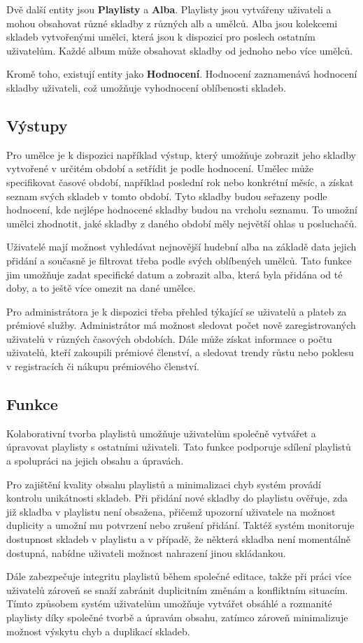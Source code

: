 Dvě další entity jsou \textbf{Playlisty} a \textbf{Alba}.
Playlisty jsou vytvářeny uživateli a mohou obsahovat různé skladby z různých alb a umělců.
Alba jsou kolekcemi skladeb vytvořenými umělci, která jsou k dispozici pro poslech ostatním uživatelům.
Každé album může obsahovat skladby od jednoho nebo více umělců.


Kromě toho, existují entity jako \textbf{Hodnocení}.
Hodnocení zaznamenává hodnocení skladby uživateli, což umožňuje vyhodnocení oblíbenosti skladeb.

\clearpage

\subsection*{Výstupy}
Pro umělce je k dispozici například výstup, který umožňuje zobrazit jeho skladby vytvořené v určitém období a setřídit je podle hodnocení.
Umělec může specifikovat časové období, například poslední rok nebo konkrétní měsíc, a získat seznam svých skladeb v tomto období.
Tyto skladby budou seřazeny podle hodnocení, kde nejlépe hodnocené skladby budou na vrcholu seznamu.
To umožní umělci zhodnotit, jaké skladby z daného období měly největší ohlas u posluchačů.


Uživatelé mají možnost vyhledávat nejnovější hudební alba na základě data jejich přidání a současně je filtrovat třeba podle svých oblíbených umělců.
Tato funkce jim umožňuje zadat specifické datum a zobrazit alba, která byla přidána od té doby, a to ještě více omezit na dané umělce.


Pro administrátora je k dispozici třeba přehled týkající se uživatelů a plateb za prémiové služby.
Administrátor má možnost sledovat počet nově zaregistrovaných uživatelů v různých časových obdobích.
Dále může získat informace o počtu uživatelů, kteří zakoupili prémiové členství, a sledovat trendy růstu nebo poklesu v registracích či nákupu prémiového členství.

\subsection*{Funkce}
Kolaborativní tvorba playlistů umožňuje uživatelům společně vytvářet a úpravovat playlisty s ostatními uživateli.
Tato funkce podporuje sdílení playlistů a spolupráci na jejich obsahu a úpravách.


Pro zajištění kvality obsahu playlistů a minimalizaci chyb systém provádí kontrolu unikátnosti skladeb.
Při přidání nové skladby do playlistu ověřuje, zda již skladba v playlistu není obsažena, přičemž upozorní
uživatele na možnost duplicity a umožní mu potvrzení nebo zrušení přidání.
Taktéž systém monitoruje dostupnost skladeb v playlistu a v případě, že některá skladba není momentálně dostupná,
nabídne uživateli možnost nahrazení jinou skládankou.


Dále zabezpečuje integritu playlistů během společné editace, takže při práci více uživatelů
zároveň se snaží zabránit duplicitním změnám a konfliktním situacím.
Tímto způsobem systém uživatelům umožňuje vytvářet obsáhlé a rozmanité playlisty díky společné tvorbě a úpravám obsahu,
zatímco zároveň minimalizuje možnost výskytu chyb a duplikací skladeb.
\clearpage